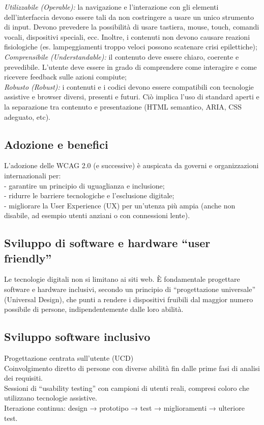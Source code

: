 \documentclass[14pt]{extbook}
\begin{document}
\textit{Utilizzabile (Operable):} la navigazione e l’interazione con gli elementi dell’interfaccia devono essere tali da non costringere a usare un unico strumento di input. Devono prevedere la possibilità di usare tastiera, mouse, touch, comandi vocali, dispositivi speciali, ecc. Inoltre, i contenuti non devono causare reazioni fisiologiche (es. lampeggiamenti troppo veloci possono scatenare crisi epilettiche);\\

\textit{Comprensibile (Understandable):} il contenuto deve essere chiaro, coerente e prevedibile. L’utente deve essere in grado di comprendere come interagire e come ricevere feedback sulle azioni compiute;\\

\textit{Robusto (Robust):} i contenuti e i codici devono essere compatibili con tecnologie assistive e browser diversi, presenti e futuri. Ciò implica l’uso di standard aperti e la separazione tra contenuto e presentazione (HTML semantico, ARIA, CSS adeguato, etc).
\pagebreak

\subsection{Adozione e benefici}
L’adozione delle WCAG 2.0 (e successive) è auspicata da governi e organizzazioni internazionali per:\\

- garantire un principio di uguaglianza e inclusione;\\

- ridurre le barriere tecnologiche e l’esclusione digitale;\\

- migliorare la User Experience (UX) per un’utenza più ampia (anche non disabile, ad esempio utenti anziani o con connessioni lente).\\

\subsection{Sviluppo di software e hardware “user friendly”}
Le tecnologie digitali non si limitano ai siti web. È fondamentale progettare software e hardware inclusivi, secondo un principio di “progettazione universale” (Universal Design), che punti a rendere i dispositivi fruibili dal maggior numero possibile di persone, indipendentemente dalle loro abilità.\\

\subsection{Sviluppo software inclusivo}
    Progettazione centrata sull’utente (UCD)\\
        Coinvolgimento diretto di persone con diverse abilità fin dalle prime fasi di analisi dei requisiti.\\
        Sessioni di “usability testing” con campioni di utenti reali, compresi coloro che utilizzano tecnologie assistive.\\
        Iterazione continua: design → prototipo → test → miglioramenti → ulteriore test.\\
\end{document}

